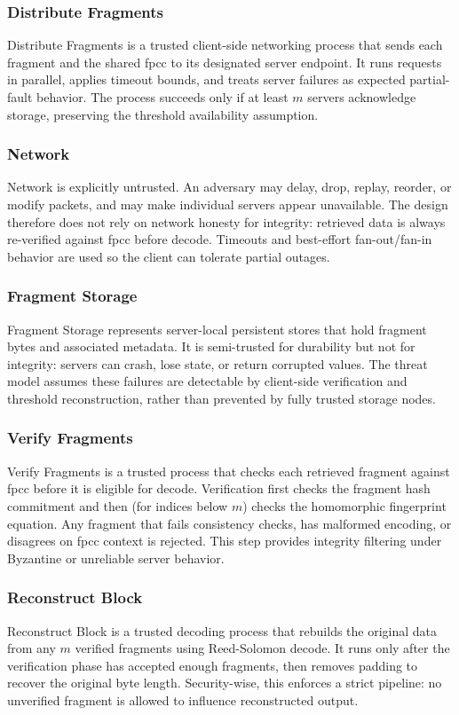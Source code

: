 \documentclass[../veristore_security_model.tex]{subfiles}
\begin{document}
\subsubsection{Distribute Fragments}

Distribute Fragments is a trusted client-side networking process that sends each fragment and the
shared fpcc to its designated server endpoint. It runs requests in parallel, applies timeout
bounds, and treats server failures as expected partial-fault behavior. The process succeeds only
if at least $m$ servers acknowledge storage, preserving the threshold availability assumption.

\subsubsection{Network}

Network is explicitly untrusted. An adversary may delay, drop, replay, reorder, or modify packets,
and may make individual servers appear unavailable. The design therefore does not rely on network
honesty for integrity: retrieved data is always re-verified against fpcc before decode. Timeouts
and best-effort fan-out/fan-in behavior are used so the client can tolerate partial outages.

\subsubsection{Fragment Storage}

Fragment Storage represents server-local persistent stores that hold fragment bytes and associated
metadata. It is semi-trusted for durability but not for integrity: servers can crash, lose state,
or return corrupted values. The threat model assumes these failures are detectable by client-side
verification and threshold reconstruction, rather than prevented by fully trusted storage nodes.

\subsubsection{Verify Fragments}

Verify Fragments is a trusted process that checks each retrieved fragment against fpcc before it is
eligible for decode. Verification first checks the fragment hash commitment and then (for indices
below $m$) checks the homomorphic fingerprint equation. Any fragment that fails consistency checks,
has malformed encoding, or disagrees on fpcc context is rejected. This step provides integrity
filtering under Byzantine or unreliable server behavior.

\subsubsection{Reconstruct Block}

Reconstruct Block is a trusted decoding process that rebuilds the original data from any $m$
verified fragments using Reed-Solomon decode. It runs only after the verification phase has
accepted enough fragments, then removes padding to recover the original byte length. Security-wise,
this enforces a strict pipeline: no unverified fragment is allowed to influence reconstructed
output.

\newpage
\end{document}
